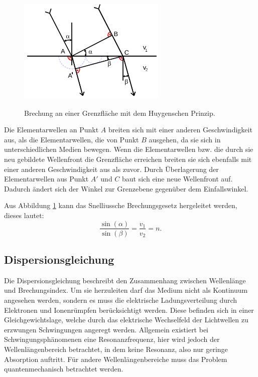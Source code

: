 \begin{figure}[H]
  \centering
  \includegraphics[height=5cm]{huygen.png}
  \caption{Brechung an einer Grenzfläche mit dem Huygenschen Prinzip.}
  \label{fig:huyg}
  \cite{skript}
\end{figure}

Die Elementarwellen an Punkt $A$ breiten sich mit einer anderen Geschwindigkeit
aus, als die Elementarwellen, die von Punkt $B$ ausgehen, da sie sich in
unterschiedlichen Medien bewegen. Wenn die Elementarwellen bzw. die
durch sie neu gebildete Wellenfront die Grenzfläche erreichen breiten sie sich
ebenfalls mit einer anderen Geschwindigkeit aus als zuvor. Durch Überlagerung
der Elementarwellen aus Punkt $A'$ und $C$ baut sich eine neue Wellenfront auf.
Dadurch ändert sich der Winkel zur Grenzebene gegenüber dem Einfallswinkel.

Aus Abbildung \ref{fig:huyg} kann das Snelliussche Brechungsgesetz hergeleitet werden,
dieses lautet:
\begin{equation}
  \frac{\sin{(\alpha)}}{\sin{(\beta)}}=\frac{v_1}{v_2}=n.
  \label{eqn:brechung}
\end{equation}

\subsection{Dispersionsgleichung}
Die Dispersionsgleichung beschreibt den Zusammenhang zwischen Wellenlänge
und Brechungsindex. Um sie herzuleiten darf das Medium nicht als Kontinuum
angesehen werden, sondern es muss die elektrische Ladungsverteilung durch
Elektronen und Ionenrümpfen berücksichtigt werden. Diese befinden sich in einer Gleichgewichtslage, welche
durch das elektrische Wechselfeld der Lichtwellen zu erzwungen Schwingungen
angeregt werden. Allgemein existiert bei Schwingungsphänomenen eine Resonanzfrequenz,
hier wird jedoch der Wellenlängenbereich betrachtet, in dem keine
Resonanz, also nur geringe Absorption auftritt. Für andere Wellenlängenbereiche
muss das Problem quantenmechanisch betrachtet werden.

